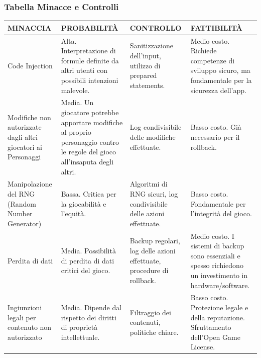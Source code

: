 \documentclass[a4paper, 11pt]{article}
\begin{document}
\subsubsection*{Tabella Minacce e Controlli}
\begin{center}
    \begin{tabular}{|p{3cm}|p{3cm}|p{3cm}|p{3.5cm}|}
        \hline
         \textbf{MINACCIA} & \textbf{PROBABILITÀ} & \textbf{CONTROLLO} & \textbf{FATTIBILITÀ} \\
         \hline
         Code Injection &Alta. Interpretazione di formule definite da altri utenti con possibili intenzioni malevole.& Sanitizzazione dell'input, utilizzo di prepared statements. & Medio costo. Richiede competenze di sviluppo sicuro, ma fondamentale per la sicurezza dell'app. \\
         \hline
         Modifiche non autorizzate dagli altri giocatori ai Personaggi & Media. Un giocatore potrebbe apportare modifiche al proprio personaggio contro le regole del gioco all’insaputa degli altri. & Log condivisibile delle modifiche effettuate. & Basso costo. Già necessario per il rollback. \\
         \hline
         Manipolazione del RNG (Random Number Generator) & Bassa. Critica per la giocabilità e l'equità. & Algoritmi di RNG sicuri, log condivisibile delle azioni effettuate. & Basso costo. Fondamentale per l'integrità del gioco. \\
         \hline
         Perdita di dati & Media. Possibilità di perdita di dati critici del gioco. & Backup regolari, log delle azioni effettuate, procedure di rollback. & Medio costo. I sistemi di backup sono essenziali e spesso richiedono un investimento in hardware/software. \\
         \hline
         Ingiunzioni legali per contenuto non autorizzato & Media. Dipende dal rispetto dei diritti di proprietà intellettuale. & Filtraggio dei contenuti, politiche chiare. & Basso costo. Protezione legale e della reputazione. Sfruttamento dell’Open Game License. \\
         \hline
    \end{tabular}
\end{center}

\vspace{2em}
\end{document}
